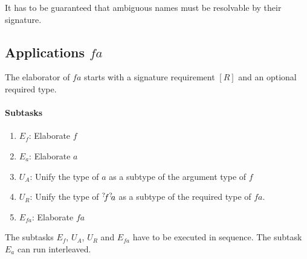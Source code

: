 It has to be guaranteed that ambiguous names must be resolvable by their
signature.








\subsection{Applications $f a$}



The elaborator of $f a$ starts with a signature requirement $[R]$ and
an optional required type.

\paragraph{Subtasks}
\begin{enumerate}
    \item $E_f$: Elaborate $f$
    \item $E_a$: Elaborate $a$
    \item $U_{A}$: Unify the type of $a$ as a subtype of the argument type of
        $f$
    \item $U_{R}$: Unify the type of ${{}^? \kern-0.2em f} {{}^? \kern-0.2em a}$ as a subtype of the
        required type of $fa$.
    \item $E_{fa}$: Elaborate $fa$
\end{enumerate}

The subtasks $E_f$, $U_A$, $U_R$ and $E_{fa}$ have to be executed in sequence. The
subtask $E_a$ can run interleaved.


